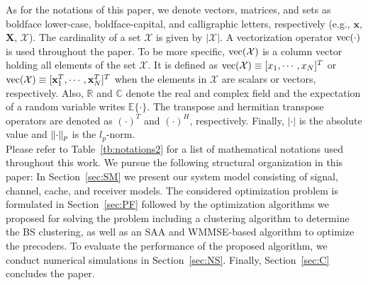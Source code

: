 \documentclass[12pt,draftcls,onecolumn]{IEEEtran}
\DeclarePairedDelimiter\normV{\lVert}{\rVert}
\theoremstyle{remark}
\theoremstyle{definition}
\begin{document}
\begin{table}[b]
\begin{tabular}{|L{0.10\textwidth}|L{0.7\textwidth}|}
	\end{tabular}
\end{table}%
As for the notations of this paper, we denote vectors, matrices, and sets as boldface lower-case, boldface-capital, and calligraphic letters, respectively (e.g., $\mathbf{x}$, $\mathbf{X}$, $\mathcal{X}$). The cardinality of a set $\mathcal{X}$ is given by $|\mathcal{X}|$. A vectorization operator $ {\rm vec}(\cdot) $ is used throughout the paper. To be more specific, $ {\rm vec}(\mathcal{X}) $ is a column vector holding all elements of the set $\mathcal{X}$. It is defined as $ {\rm vec}(\mathcal{X}) \equiv [x_1,\cdots,x_N]^T $ or $ {\rm vec}(\mathcal{X}) \equiv [\mathbf{x}_1^T,\cdots,\mathbf{x}_N^T]^T $ when the elements in $\mathcal{X}$ are scalars or vectors, respectively. Also, $\mathbb{R}$ and $\mathbb{C}$ denote the real and complex field and the expectation of a random variable writes $\mathbb{E}\{\cdot\}$. The transpose and hermitian transpose operators are denoted as $\left( \cdot \right)^{T}$ and $\left( \cdot \right)^{H}$, respectively. Finally, $\left|\cdot\right|$ is the absolute value and $\normV[]{\cdot}_{p}$ is the $l_p$-norm. \\
\indent Please refer to Table~\ref{tb:notations2} for a list of mathematical notations used throughout this work. We pursue the following structural organization in this paper: In Section~\ref{sec:SM} we present our system model consisting of signal, channel, cache, and receiver models. The considered optimization problem is formulated in Section~\ref{sec:PF} followed by the optimization algorithms we proposed for solving the problem including a clustering algorithm to determine the BS clustering, as well as an SAA and WMMSE-based algorithm to optimize the precoders. To evaluate the performance of the proposed algorithm, we conduct numerical simulations in Section~\ref{sec:NS}. Finally, Section~\ref{sec:C} concludes the paper.
\end{document}
